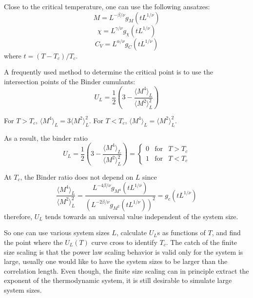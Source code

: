 Close to the critical temperature, one can use the following ansatzes:
\begin{equation}
  \label{eq:17}
  M=L^{-\beta/\nu}g_M(tL^{1/\nu})
\end{equation}
\begin{equation}
  \label{eq:19}
  \chi=L^{\gamma/\nu}g_\chi(tL^{1/\nu})
\end{equation}
\begin{equation}
  \label{eq:18}
  C_V=L^{\alpha/\nu}g_C(tL^{1/\nu})
\end{equation}
where $t=(T-T_c)/T_c$.

A frequently used method to determine the critical point is to use
the intersection points of the Binder cumulants:
\begin{equation}
  \label{eq:14}
  U_L=\frac{1}{2}\left(3-\frac{\langle M^4\rangle_L}{\langle M^2\rangle^2_L}\right)
\end{equation}

For $T>T_c$, $\langle M^4\rangle_L = 3 \langle M^2\rangle_L^2$. 
For $T<T_c$, $\langle M^4\rangle_L = \langle M^2\rangle_L^2$.

As a result, the binder ratio
\begin{equation}
  \label{eq:16}
  U_L=\frac{1}{2}\left(3-\frac{\langle M^4\rangle_L}{\langle M^2\rangle^2_L}\right)
  =\left\{
    \begin{array}{ccc}
      0 & \mathrm{for} & T>T_c\\
      1 & \mathrm{for} & T<T_c
    \end{array}
  \right.
\end{equation}

At $T_c$, the Binder ratio does not depend on $L$ since
\begin{equation}
  \label{eq:15}
  \frac{\langle M^4\rangle_L}{\langle M^2\rangle^2_L}
  =\frac{L^{-4\beta/\nu}g_{M^4}(tL^{1/\nu})}{\left(L^{-2\beta/\nu}g_{M^2}(tL^{1/\nu})\right)^2}
  =g_c(tL^{1/\nu})
\end{equation}
therefore, $U_L$ tends towards an universal value independent of the system size.

So one can use various system sizes $L$, calculate $U_L$s as functions of $T$,
and find the point where the $U_L(T)$ curve cross to identify $T_c$. The catch
of the finite size scaling is that the power law scaling behavior is valid
only for the system is large, usually one would like to have the system
sizes to be larger than the correlation length. Even though, the finite size
scaling can in principle extract the exponent of the thermodynamic system,
it is still desirable to simulate large system sizes.
  
